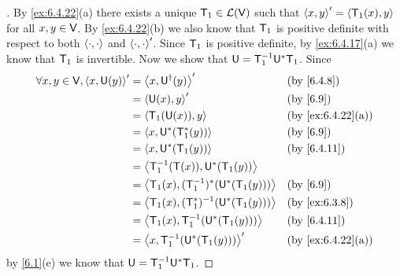 \begin{proof}[]
  By \cref{ex:6.4.22}(a) there exists a unique \(\mathsf{T}_1 \in \mathcal{L}(\mathsf{V})\) such that \(\left\langle x, y\right\rangle' = \left\langle\mathsf{T}_1(x), y\right\rangle\) for all \(x, y \in \mathsf{V}\).
  By \cref{ex:6.4.22}(b) we also know that \(\mathsf{T}_1\) is positive definite with respect to both \(\left\langle\cdot, \cdot\right\rangle\) and \(\left\langle\cdot, \cdot\right\rangle'\).
  Since \(\mathsf{T}_1\) is positive definite, by \cref{ex:6.4.17}(a) we know that \(\mathsf{T}_1\) is invertible.
  Now we show that \(\mathsf{U} = \mathsf{T}_1^{-1} \mathsf{U}^* \mathsf{T}_1\).
  Since
  \begin{align*}
    \forall x, y \in \V, \inn{x, \U(y)}' & = \inn{x, \U^{\dag}(y)}'                      &  & \by{6.4.8}        \\
                                         & = \inn{\U(x), y}'                             &  & \by{6.9}          \\
                                         & = \inn{\T_1(\U(x)), y}                        &  & \by{ex:6.4.22}[a] \\
                                         & = \inn{x, \U^*(\T_1^*(y))}                    &  & \by{6.9}          \\
                                         & = \inn{x, \U^*(\T_1(y))}                      &  & \by{6.4.11}       \\
                                         & = \inn{\T_1^{-1}(\T(x)), \U^*(\T_1(y))}                              \\
                                         & = \inn{\T_1(x), (\T_1^{-1})^*(\U^*(\T_1(y)))} &  & \by{6.9}          \\
                                         & = \inn{\T_1(x), (\T_1^*)^{-1}(\U^*(\T_1(y)))} &  & \by{ex:6.3.8}     \\
                                         & = \inn{\T_1(x), \T_1^{-1}(\U^*(\T_1(y)))}     &  & \by{6.4.11}       \\
                                         & = \inn{x, \T_1^{-1}(\U^*(\T_1(y)))}'          &  & \by{ex:6.4.22}[a]
  \end{align*}
  by \cref{6.1}(e) we know that \(\mathsf{U} = \mathsf{T}_1^{-1} \mathsf{U}^* \mathsf{T}_1\).


\end{proof}
